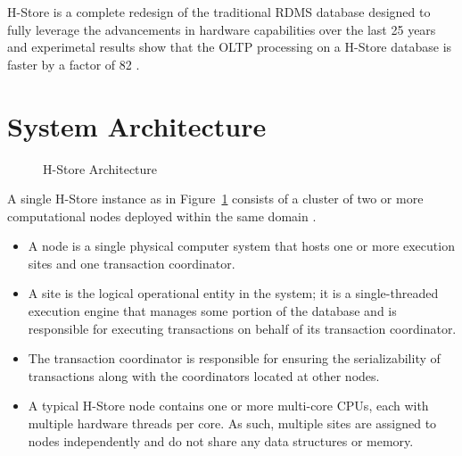 \documentclass[9pt,twocolumn,twoside]{../../styles/osajnl}
\begin{document}
H-Store is a complete redesign of the traditional RDMS database designed to fully leverage the advancements in hardware capabilities over the last 25 years and 
experimetal results show that the OLTP processing on a H-Store database is 
faster 
by a factor of 82 \cite{stonebraker2007}.

\section{System Architecture}

\begin{figure}[http]
\centering
\graphicspath{ {images/} }
\caption{H-Store Architecture} \cite{www-H-StoreArch}
\label{fig:false-color}
\end{figure}

A single H-Store instance as in Figure~\ref{fig:false-color} consists of a cluster 
of two or more computational nodes deployed within the same domain \cite{www-H-StoreArch}. 
\begin{itemize}
\item A node is a single physical computer system that hosts one or more execution sites and one transaction coordinator. 
\item A site is the logical operational entity in the system; it is a single-threaded 
execution engine that manages some portion of the database and is responsible 
for executing transactions on behalf of its transaction coordinator. 
\item The transaction coordinator is responsible for ensuring the serializability of 
transactions along with the coordinators located at other nodes.
\item A typical H-Store node contains one or more multi-core CPUs, each with multiple hardware 
threads per core. As such, multiple sites are assigned to nodes independently 
and do not share any data structures or memory.
\end{itemize}
\end{document}
